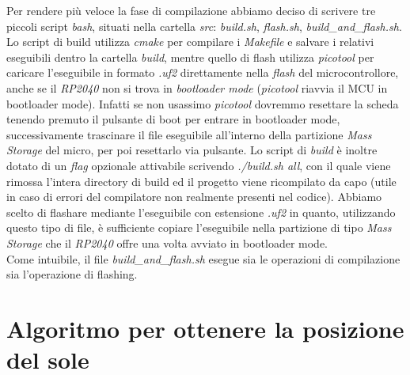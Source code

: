 \noindent Per rendere più veloce la fase di compilazione abbiamo deciso di
scrivere tre piccoli script \emph{bash}, situati nella cartella
\emph{src}: \emph{build.sh}, \emph{flash.sh},
\emph{build\_and\_flash.sh}. Lo script di build utilizza \emph{cmake}
per compilare i \emph{Makefile} e salvare i relativi eseguibili dentro
la cartella \emph{build}, mentre quello di flash utilizza
\emph{picotool} per caricare l'eseguibile in formato \emph{.uf2}
direttamente nella \emph{flash} del microcontrollore, anche se il \textit{RP2040}
non si trova in \textit{bootloader mode} (\emph{picotool} riavvia il MCU in
bootloader mode). Infatti se non usassimo \emph{picotool} dovremmo
resettare la scheda tenendo premuto il pulsante di boot per entrare in
bootloader mode, successivamente trascinare il file eseguibile
all'interno della partizione \textit{Mass Storage} del micro, per poi resettarlo
via pulsante. Lo script di \emph{build} è inoltre dotato di un
\emph{flag} opzionale attivabile scrivendo \emph{./build.sh all}, con il
quale viene rimossa l'intera directory di build ed il progetto viene
ricompilato da capo (utile in caso di errori del compilatore non
realmente presenti nel codice). Abbiamo scelto di flashare mediante
l'eseguibile con estensione \emph{.uf2} in quanto, utilizzando questo
tipo di file, è sufficiente copiare l'eseguibile nella partizione di
tipo \textit{Mass Storage} che il \textit{RP2040} offre una volta avviato in bootloader
mode.\\
Come intuibile, il file \emph{build\_and\_flash.sh} esegue sia le
operazioni di compilazione sia l'operazione di flashing.

\hypertarget{algoritmo-per-ottenere-la-posizione-del-sole}{%
\section{Algoritmo per ottenere la posizione del
sole}\label{algoritmo-per-ottenere-la-posizione-del-sole}}

